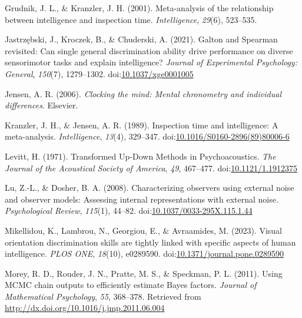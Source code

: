 \documentclass[
  ,man]{apa6}
\newlength{\cslhangindent}
\newenvironment{CSLReferences}[2] %
 {\begin{list}{}{%
  \setlength{\itemindent}{0pt}
  \setlength{\leftmargin}{0pt}
  \setlength{\parsep}{0pt}
  \ifodd #1
   \setlength{\leftmargin}{\cslhangindent}
   \setlength{\itemindent}{-1\cslhangindent}
  \fi
  \setlength{\itemsep}{#2\baselineskip}}}
 {\end{list}}
\begin{document}
\begin{CSLReferences}{1}{0}
Grudnik, J. L., \& Kranzler, J. H. (2001). Meta-analysis of the relationship between intelligence and inspection time. \emph{Intelligence}, \emph{29}(6), 523--535.

Jastrzębski, J., Kroczek, B., \& Chuderski, A. (2021). Galton and {Spearman} revisited: {Can} single general discrimination ability drive performance on diverse sensorimotor tasks and explain intelligence? \emph{Journal of Experimental Psychology: General}, \emph{150}(7), 1279--1302. doi:\href{https://doi.org/10.1037/xge0001005}{10.1037/xge0001005}

Jensen, A. R. (2006). \emph{Clocking the mind: {Mental} chronometry and individual differences}. Elsevier.

Kranzler, J. H., \& Jensen, A. R. (1989). Inspection time and intelligence: {A} meta-analysis. \emph{Intelligence}, \emph{13}(4), 329--347. doi:\href{https://doi.org/10.1016/S0160-2896(89)80006-6}{10.1016/S0160-2896(89)80006-6}

Levitt, H. (1971). Transformed {Up}‐{Down Methods} in {Psychoacoustics}. \emph{The Journal of the Acoustical Society of America}, \emph{49}, 467--477. doi:\href{https://doi.org/10.1121/1.1912375}{10.1121/1.1912375}

Lu, Z.-L., \& Dosher, B. A. (2008). Characterizing observers using external noise and observer models: {Assessing} internal representations with external noise. \emph{Psychological Review}, \emph{115}(1), 44--82. doi:\href{https://doi.org/10.1037/0033-295X.115.1.44}{10.1037/0033-295X.115.1.44}

Mikellidou, K., Lambrou, N., Georgiou, E., \& Avraamides, M. (2023). Visual orientation discrimination skills are tightly linked with specific aspects of human intelligence. \emph{PLOS ONE}, \emph{18}(10), e0289590. doi:\href{https://doi.org/10.1371/journal.pone.0289590}{10.1371/journal.pone.0289590}

Morey, R. D., Rouder, J. N., Pratte, M. S., \& Speckman, P. L. (2011). Using {MCMC} chain outputs to efficiently estimate {Bayes} factors. \emph{Journal of Mathematical Psychology}, \emph{55}, 368--378. Retrieved from \url{http://dx.doi.org/10.1016/j.jmp.2011.06.004}


\end{CSLReferences}
\end{document}
